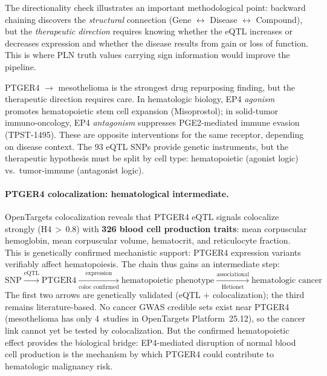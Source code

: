\documentclass[11pt,openany]{report}
\begin{document}
\medskip\noindent
The directionality check illustrates an important methodological
point: backward chaining discovers the \emph{structural} connection
(Gene $\leftrightarrow$ Disease $\leftrightarrow$ Compound), but
the \emph{therapeutic direction} requires knowing whether the eQTL
increases or decreases expression and whether the disease results
from gain or loss of function.  This is where PLN truth values
carrying sign information would improve the pipeline.

PTGER4 $\to$ mesothelioma is the strongest drug repurposing
finding, but the therapeutic direction requires care.
In hematologic biology, EP4 \emph{agonism} promotes
hematopoietic stem cell expansion (Misoprostol); in
solid-tumor immuno-oncology, EP4 \emph{antagonism} suppresses
PGE2-mediated immune evasion (TPST-1495).  These are
opposite interventions for the same receptor, depending on
disease context.  The 93 eQTL SNPs provide genetic instruments,
but the therapeutic hypothesis must be split by cell type:
hematopoietic (agonist logic) vs.\ tumor-immune (antagonist
logic).

\paragraph{PTGER4 colocalization: hematological intermediate.}
OpenTargets colocalization reveals that PTGER4 eQTL signals
colocalize strongly (H4\,$>$\,0.8) with \textbf{326 blood cell
production traits}: mean corpuscular hemoglobin, mean corpuscular
volume, hematocrit, and reticulocyte fraction.  This is
genetically confirmed mechanistic support: PTGER4 expression
variants verifiably affect hematopoiesis.  The chain thus gains
an intermediate step:
\[
  \text{SNP} \xrightarrow{\text{eQTL}} \text{PTGER4}
  \xrightarrow[\text{coloc confirmed}]{\text{expression}}
  \text{hematopoietic phenotype}
  \xrightarrow[\text{Hetionet}]{\text{associational}}
  \text{hematologic cancer}
\]
The first two arrows are genetically validated (eQTL $+$
colocalization); the third remains literature-based.  No cancer
GWAS credible sets exist near PTGER4 (mesothelioma has only
4~studies in OpenTargets Platform~25.12), so the cancer link
cannot yet be tested by colocalization.  But the confirmed
hematopoietic effect provides the biological bridge: EP4-mediated
disruption of normal blood cell production is the mechanism by
which PTGER4 could contribute to hematologic malignancy risk.
\end{document}

